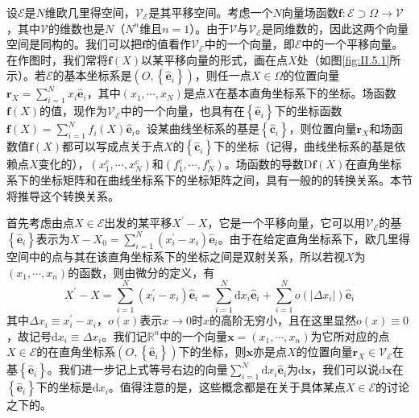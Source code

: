 \documentclass[../main.tex]{subfiles}
\begin{document}
设$\mathcal{E}$是$N$维欧几里得空间，$\mathcal{V}_{\mathcal{E}}$是其平移空间。考虑一个$N$向量场函数$\mathbf{f}:\mathcal{E}\supset\Omega\rightarrow\mathcal{V}$，其中$\mathcal{V}$的维数也是$N$（$N^n$维且$n=1$）。由于$\mathcal{V}$与$\mathcal{V}_{\mathcal{E}}$是同维数的，因此这两个向量空间是同构的。我们可以把$\mathbf{f}$的值看作$\mathcal{V}_{\mathcal{E}}$中的一个向量，即$\mathcal{E}$中的一个平移向量。在作图时，我们常将$\mathbf{f}\left(X\right)$以某平移向量的形式，画在点$X$处（如图\ref{fig:II.5.1}所示）。若$\mathcal{E}$的基本坐标系是$\left(O,\left\{\mathbf{\hat{e}}_i\right\}\right)$，则任一点$X\in\Omega$的位置向量$\mathbf{r}_X=\sum_{i=1}^N x_i \mathbf{\hat{e}}_i$，其中$\left(x_1,\cdots,x_N\right)$是点$X$在基本直角坐标系下的坐标。场函数$\mathbf{f}\left(X\right)$的值，现作为$\mathcal{V}_{\mathcal{E}}$中的一个向量，也具有在$\left\{\mathbf{\hat{e}}_i\right\}$下的坐标函数$\mathbf{f}\left(X\right)=\sum_{i=1}^N f_i \left(X\right) \mathbf{\hat{e}}_i$。设某曲线坐标系的基是$\left\{\mathbf{\hat{c}}_i\right\}$，则位置向量$\mathbf{r}_X$和场函数值$\mathbf{f}\left(X\right)$都可以写成点关于点$X$的$\left\{\mathbf{\hat{c}}_i\right\}$下的坐标（记得，曲线坐标系的基是依赖点$X$变化的），$\left(x_1^\mathrm{c},\cdots,x_N^\mathrm{c}\right)$和$\left(f_1^\mathrm{c},\cdots,f_N^\mathrm{c}\right)$。场函数的导数$\mathrm{D}\mathbf{f}\left(X\right)$在直角坐标系下的坐标矩阵和在曲线坐标系下的坐标矩阵之间，具有一般的的转换关系。本节将推导这个转换关系。

首先考虑由点$X\in\mathcal{E}$出发的某平移$X^\prime-X$，它是一个平移向量，它可以用$\mathcal{V}_{\mathcal{E}}$的基$\left\{\mathbf{\hat{e}}_i\right\}$表示为$X-X_0=\sum_{i=1}^N\left(x_i^\prime-x_i\right)\mathbf{\hat{e}}_i$。由于在给定直角坐标系下，欧几里得空间中的点与其在该直角坐标系下的坐标之间是双射关系，所以若视$X$为$\left(x_1,\cdots,x_n\right)$的函数，则由微分的定义，有
\[X^\prime-X=\sum_{i=1}^N\left(x_i^\prime-x_i\right)\mathbf{\hat{e}}_i=\sum_{i=1}^N \mathrm{d}x_i\mathbf{\hat{e}}_i+\sum_{i=1}^No\left(\left|\Delta x_i\right|\right)\mathbf{\hat{e}}_i\]
其中$\Delta x_i\equiv x_i^\prime-x_i$，$o\left(x\right)$表示$x\rightarrow 0$时$x$的高阶无穷小，且在这里显然$o\left(x\right)\equiv 0$，故记号$\mathrm{d}x_i \equiv \Delta x_i$。我们记$\mathbb{R}^n$中的一个向量$\mathbf{x}=\left(x_1,\cdots,x_n\right)$为它所对应的点$X\in\mathcal{E}$的在直角坐标系$\left(O,\left\{\mathbf{\hat{e}}_i\right\}\right)$下的坐标，则$\mathbf{x}$亦是点$X$的位置向量$\mathbf{r}_X\in\mathcal{V}_{\mathcal{E}}$在基$\left\{\mathbf{\hat{e}}_i\right\}$。我们进一步记上式等号右边的向量$\sum_{i=1}^N\mathrm{d}x_i\mathbf{\hat{e}}_i$为$\mathrm{d}\mathbf{x}$，我们可以说$\mathrm{d}\mathbf{x}$在$\left\{\mathbf{\hat{e}}_i\right\}$下的坐标是$\mathrm{d}x_i$。值得注意的是，这些概念都是在关于具体某点$X\in\mathcal{E}$的讨论之下的。
\end{document}
